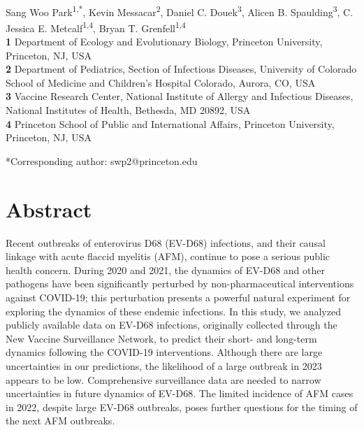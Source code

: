 \documentclass[12pt]{article}
\date{\today}
\begin{document}
\begin{flushleft}{
	\Large
	\textbf{}
}
\newline
\\
Sang Woo Park\textsuperscript{1,*},
Kevin Messacar\textsuperscript{2},
Daniel C. Douek\textsuperscript{3},
Alicen B. Spaulding\textsuperscript{3},
C. Jessica E. Metcalf\textsuperscript{1,4},
Bryan T. Grenfell\textsuperscript{1,4}
\\
\bigskip
\textbf{1} Department of Ecology and Evolutionary Biology, Princeton University, Princeton, NJ, USA
\\
\textbf{2} Department of Pediatrics, Section of Infectious Diseases, University of Colorado School of Medicine and Children's Hospital Colorado, Aurora, CO, USA
\\
\textbf{3} Vaccine Research Center, National Institute of Allergy and Infectious Diseases, National Institutes of Health, Bethesda, MD 20892, USA\\
\textbf{4} Princeton School of Public and International Affairs, Princeton University, Princeton, NJ, USA
\\
\bigskip

*Corresponding author: swp2@princeton.edu
\bigskip
\end{flushleft}

\section*{Abstract}

Recent outbreaks of enterovirus D68 (EV-D68) infections, and their causal linkage with acute flaccid myelitis (AFM), continue to pose a serious public health concern.
During 2020 and 2021, the dynamics of EV-D68 and other pathogens have been significantly perturbed by non-pharmaceutical interventions against COVID-19; this perturbation presents a powerful natural experiment for exploring the dynamics of these endemic infections.
In this study, we analyzed publicly available data on EV-D68 infections, originally collected through the New Vaccine Surveillance Network, to predict their short- and long-term dynamics following the COVID-19 interventions.
Although there are large uncertainties in our predictions, the likelihood of a large outbreak in 2023 appears to be low.
Comprehensive surveillance data are needed to narrow uncertainties in future dynamics of EV-D68.
The limited incidence of AFM cases in 2022, despite large EV-D68 outbreaks, poses further questions for the timing of the next AFM outbreaks.
\end{document}
